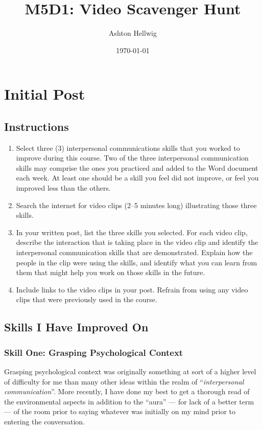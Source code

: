 \documentclass[stu,12pt]{apa7}
\title{%
    M5D1: Video Scavenger Hunt
  }
\author{Ashton Hellwig}
\date{\today}
\begin{document}
  \maketitle

  \section{Initial Post}
    \subsection*{Instructions}
      \begin{enumerate}
        \item Select three (3) interpersonal communications skills that you
          worked to improve during this course. Two of the three interpersonal
          communication skills may comprise the ones you practiced and added to
          the Word document each week. At least one should be a skill you feel
          did not improve, or feel you improved less than the others.
        \item Search the internet for video clips (2--5 minutes long)
          illustrating those three skills.
        \item In your written post, list the three skills you selected. For
          each video clip, describe the interaction that is taking place in the
          video clip and identify the interpersonal communication skills that
          are demonstrated. Explain how the people in the clip were using the
          skills, and identify what you can learn from them that might help you
          work on those skills in the future.
        \item Include links to the video clips in your post. Refrain from using
          any video clips that were previously used in the course.
      \end{enumerate}


    \newpage
    \subsection{Skills I Have Improved On}
      \subsubsection{Skill One: Grasping Psychological Context}
        Grasping psychological context was originally something at sort of a
          higher level of difficulty for me than many other ideas within the
          realm of ``\textit{interpersonal communication}''. More recently, I
          have done my best to get a thorough read of the environmental aspects
          in addition to the ``aura'' --- for lack of a better term --- of the
          room prior to saying whatever was initially on my mind prior to
          entering the conversation.
\end{document}
